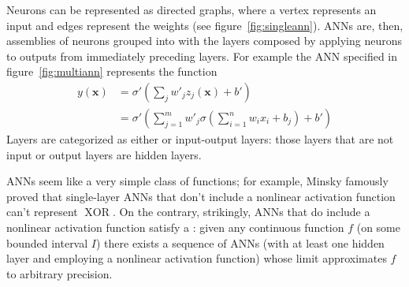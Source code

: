 Neurons can be represented as directed graphs, where a vertex represents an input and edges represent the weights (see figure~\ref{fig:singleann}).
%
ANNs are, then, assemblies of neurons grouped into  with the layers composed by applying neurons to outputs from immediately preceding layers.
%
For example the ANN specified in figure~\ref{fig:multiann} represents the function
\begin{equation}
    \begin{split}
        y(\mathbf{x}) &= \sigma' \left( \sum_j w'_j z_j(\mathbf{x}) + b' \right) \\
        &=  \sigma' \left( \sum_{j=1}^m w'_j \sigma\left(\sum_{i=1}^n w_i x_i + b_j\right) + b' \right)
    \end{split}
\end{equation}
%
Layers are categorized as either  or input-output layers: those layers that are not input or output layers are hidden layers.

ANNs seem like a very simple class of functions; for example, Minsky \etal \cite{minsky2017perceptrons} famously proved that single-layer ANNs that don't include a nonlinear activation function can't represent \(\operatorname{XOR}\). 
%
On the contrary, strikingly, ANNs that do include a nonlinear activation function satisfy a  \cite{cybenko1989approximation}:
%
given any continuous function \(f\) (on some bounded interval \(I\)) there exists a sequence of ANNs (with at least one hidden layer and employing a nonlinear activation function) whose limit approximates \(f\) to arbitrary precision.

